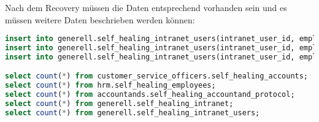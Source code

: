 Nach dem Recovery müssen die Daten entsprechend vorhanden sein und es müssen weitere Daten beschrieben werden können:
\lstset{style=gra_codestyle}
\begin{lstlisting}[language=sql, caption=StackGres-Citus - Self Healing Tests - Recovery Data,captionpos=b,label={lst:stackgres_citus-self-healing-recovery-data},breaklines=true]
insert into generell.self_healing_intranet_users(intranet_user_id, employees_id) values(1000, 400);
insert into generell.self_healing_intranet_users(intranet_user_id, employees_id) values(2000, 500);
insert into generell.self_healing_intranet_users(intranet_user_id, employees_id) values(3000, 600);

select count(*) from customer_service_officers.self_healing_accounts;
select count(*) from hrm.self_healing_employees;
select count(*) from accountands.self_healing_accountand_protocol;
select count(*) from generell.self_healing_intranet;
select count(*) from generell.self_healing_intranet_users;
\end{lstlisting}
